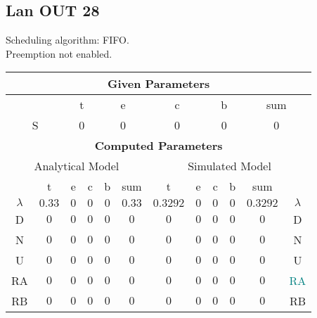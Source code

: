 \documentclass{article}
\begin{document}
\subsection{Lan OUT 28}
Scheduling algorithm: FIFO.\\Preemption not enabled. \\\begin{table}[H]\centering\begin{tabular}{@{}c|cccc|c||cccc|c|c@{}}\toprule\multicolumn{12}{c}{\textbf{Given Parameters}}\\\midrule\multicolumn{2}{c|}{ } & \multicolumn{2}{c}{t} & \multicolumn{2}{c}{e} & \multicolumn{2}{c}{c} & \multicolumn{2}{c}{b} & \multicolumn{2}{|c}{sum} \\ \midrule\multicolumn{2}{c|}{S} & \multicolumn{2}{c}{0} & \multicolumn{2}{c}{0} & \multicolumn{2}{c}{0} & \multicolumn{2}{c}{0} & \multicolumn{2}{|c}{0}\\ \midrule\midrule\multicolumn{12}{c}{\textbf{Computed Parameters}}\\ \midrule\multicolumn{6}{c||}{Analytical Model} & \multicolumn{6}{c}{Simulated Model}\\ 
 \midrule & t & e & c & b & sum & t & e & c & b & sum &  \\ \midrule$\lambda$ &$0.33$ & $0$ & $0$ & $0$ & $0.33$ & $0.3292$ & $0$ & $0$ & $0$ & $0.3292$& $\lambda$ \\D & $0$ & $0$ & $0$ & $0$ & $0$ & $0$ & $0$ & $0$ & $0$ & $0$& D\\N & $0$ & $0$ & $0$ & $0$ & $0$ & $0$ & $0$ & $0$ & $0$ & $0$& N\\U & $0$ & $0$ & $0$ & $0$ & $0$ & $0$ & $0$ & $0$ & $0$ & $0$& U\\RA & $0$ & $0$ & $0$ & $0$ & $0$ & $0$ & $0$ & $0$ & $0$ & $0$& \textcolor{teal}{RA}\\RB & $0$ & $0$ & $0$ & $0$ & $0$ & $0$ & $0$ & $0$ & $0$ & $0$& RB\\
\bottomrule
\end{tabular}
\end{table}
\filbreak
\end{document}
